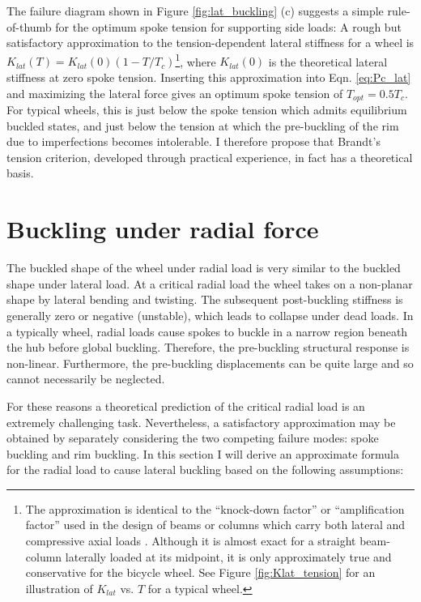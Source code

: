 \documentclass[\rootdir/thesis.tex]{subfiles}
\begin{document}
The failure diagram shown in Figure \ref{fig:lat_buckling} (c) suggests a simple rule-of-thumb for the optimum spoke tension for supporting side loads: A rough but satisfactory approximation to the tension-dependent lateral stiffness for a wheel is $K_{lat} (T)=K_{lat} (0)(1-T/T_c)$\footnote{The approximation is identical to the ``knock-down factor'' or ``amplification factor'' used in the design of beams or columns which carry both lateral and compressive axial loads \cite{Timoshenko1961}. Although it is almost exact for a straight beam-column laterally loaded at its midpoint, it is only approximately true and conservative for the bicycle wheel. See Figure \ref{fig:Klat_tension} for an illustration of $K_{lat}$ vs. $T$ for a typical wheel.}, where $K_{lat} (0)$ is the theoretical lateral stiffness at zero spoke tension. Inserting this approximation into Eqn. \eqref{eq:Pc_lat} and maximizing the lateral force gives an optimum spoke tension of $T_{opt} = 0.5 T_c$. For typical wheels, this is just below the spoke tension which admits equilibrium buckled states, and just below the tension at which the pre-buckling of the rim due to imperfections becomes intolerable. I therefore propose that Brandt's tension criterion, developed through practical experience, in fact has a theoretical basis.


\section{Buckling under radial force}

The buckled shape of the wheel under radial load is very similar to the buckled shape under lateral load. At a critical radial load the wheel takes on a non-planar shape by lateral bending and twisting. The subsequent post-buckling stiffness is generally zero or negative (unstable), which leads to collapse under dead loads. In a typically wheel, radial loads cause spokes to buckle in a narrow region beneath the hub before global buckling. Therefore, the pre-buckling structural response is non-linear. Furthermore, the pre-buckling displacements can be quite large and so cannot necessarily be neglected.

For these reasons a theoretical prediction of the critical radial load is an extremely challenging task. Nevertheless, a satisfactory approximation may be obtained by separately considering the two competing failure modes: spoke buckling and rim buckling. In this section I will derive an approximate formula for the radial load to cause lateral buckling based on the following assumptions:
\end{document}
